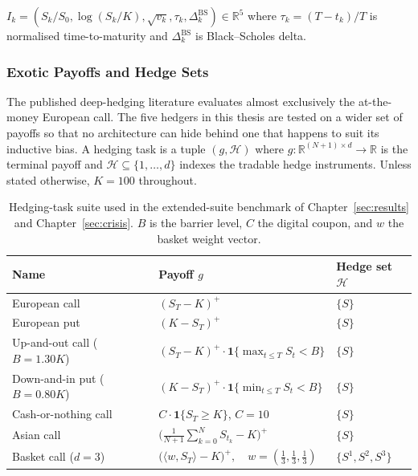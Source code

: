 \documentclass[11pt,oneside]{report}
\newcommand{\R}{\mathbb{R}}
\begin{document}
$I_k = (S_k/S_0, \log(S_k/K), \sqrt{v_k}, \tau_k, \Delta_k^{\mathrm{BS}}) \in \R^5$ where $\tau_k = (T-t_k)/T$ is normalised time-to-maturity and $\Delta_k^{\mathrm{BS}}$ is Black--Scholes delta.

\subsubsection{Exotic Payoffs and Hedge Sets}
\label{sec:tasks}

The published deep-hedging literature evaluates almost exclusively the at-the-money European call. The five hedgers in this thesis are tested on a wider set of payoffs so that no architecture can hide behind one that happens to suit its inductive bias. A hedging task is a tuple $(g, \mathcal{H})$ where $g:\R^{(N+1)\times d}\to\R$ is the terminal payoff and $\mathcal{H}\subseteq\{1,\ldots,d\}$ indexes the tradable hedge instruments. Unless stated otherwise, $K=100$ throughout.

\begin{table}[H]
\centering\small
\caption{Hedging-task suite used in the extended-suite benchmark of Chapter~\ref{sec:results} and Chapter~\ref{sec:crisis}.  $B$ is the barrier level, $C$ the digital coupon, and $w$ the basket weight vector.}
\label{tab:tasks}
\begin{tabular}{@{}lll@{}}
\toprule
\textbf{Name} & \textbf{Payoff $g$} & \textbf{Hedge set $\mathcal{H}$} \\\midrule
European call          & $(S_T-K)^+$                                                                & $\{S\}$ \\
European put           & $(K-S_T)^+$                                                                & $\{S\}$ \\
Up-and-out call ($B = 1.30K$)        & $(S_T-K)^+\cdot\mathbf{1}\{\max_{t\le T}S_t<B\}$            & $\{S\}$ \\
Down-and-in put  ($B = 0.80K$)        & $(K-S_T)^+\cdot\mathbf{1}\{\min_{t\le T}S_t<B\}$            & $\{S\}$ \\
Cash-or-nothing call   & $C\cdot \mathbf{1}\{S_T\ge K\}$, $C=10$                                    & $\{S\}$ \\
Asian call             & $\bigl(\frac{1}{N+1}\sum_{k=0}^N S_{t_k}-K\bigr)^+$                       & $\{S\}$ \\
Basket call ($d=3$)    & $\bigl(\langle w, S_T\rangle - K\bigr)^+,\quad w=(\tfrac13,\tfrac13,\tfrac13)$ & $\{S^1,S^2,S^3\}$ \\
\bottomrule
\end{tabular}
\end{table}
\end{document}
